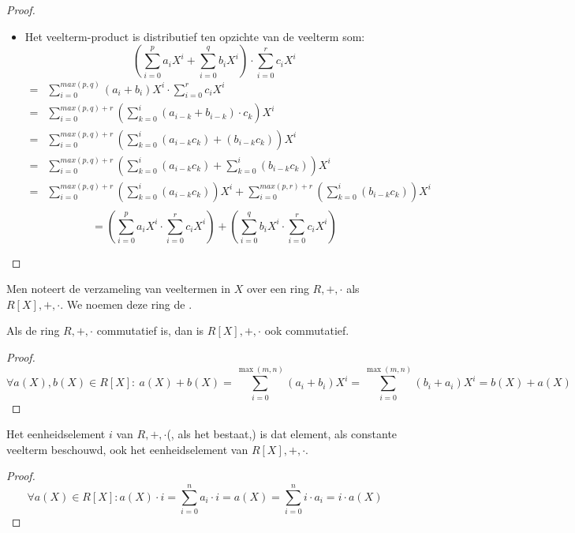 \documentclass[main.tex]{subfiles}
\begin{document}
\begin{ei}
\begin{proof}
\begin{itemize}
    \item Het veelterm-product is distributief ten opzichte van de veelterm som:
      \[ \left(\sum_{i=0}^{p}a_{i} X^{i} + \sum_{i=0}^{q}b_{i} X^{i}\right)  \cdot \sum_{i=0}^{r}c_{i} X^{i} \]
      \[
      \begin{array}{rc}
        =&
           \sum_{i=0}^{max(p,q)}(a_{i}+b_{i}) X^{i}  \cdot \sum_{i=0}^{r}c_{i} X^{i}\\
        =&
           \sum_{i=0}^{max(p,q)+r} \left(\sum_{k=0}^{i}(a_{i-k}+b_{i-k})\cdot c_{k}\right) X^{i}\\
        =&
           \sum_{i=0}^{max(p,q)+r} \left(\sum_{k=0}^{i}(a_{i-k}c_{k})+(b_{i-k}c_{k})\right) X^{i}\\
        =&
           \sum_{i=0}^{max(p,q)+r} \left(\sum_{k=0}^{i}(a_{i-k}c_{k}) + \sum_{k=0}^{i}\left(b_{i-k}c_{k}\right)\right) X^{i}\\
        =&
           \sum_{i=0}^{max(p,q)+r} \left(\sum_{k=0}^{i}(a_{i-k}c_{k})\right)X^{i} +  \sum_{i=0}^{max(p,r)+r} \left(\sum_{k=0}^{i}\left(b_{i-k}c_{k}\right)\right) X^{i}\\
      \end{array}
\]
      \[ = \left(\sum_{i=0}^{p}a_{i} X^{i} \cdot \sum_{i=0}^{r}c_{i} X^{i}\right)  + \left(\sum_{i=0}^{q}b_{i} X^{i} \cdot \sum_{i=0}^{r}c_{i} X^{i}\right) \]
    \end{itemize}
  \end{proof}
\end{ei}

\begin{de}
  Men noteert de verzameling van veeltermen in $X$ over een ring $R,+,\cdot$ als $R[X],+,\cdot$.
  We noemen deze ring de .
\end{de}

\begin{st}
  \label{st:veeltermen-comm-asa-ring-comm}
  Als de ring $R,+,\cdot$ commutatief is, dan is $R[X],+,\cdot$ ook commutatief.
  \begin{proof}
    \[ \forall a(X), b(X) \in R[X]:\ a(X) + b(X) = \sum_{i=0}^{\max(m,n)}(a_{i} + b_{i})X^{i} = \sum_{i=0}^{\max(m,n)}(b_{i} + a_{i})X^{i} = b(X) + a(X) \]
  \end{proof}
\end{st}

\begin{st}
  \label{st:veeltermen-eenh-asa-ring-eenh}
    Het eenheidselement $i$ van $R,+,\cdot$(, als het bestaat,) is dat element, als constante veelterm beschouwd, ook het eenheidselement van $R[X],+,\cdot$.
    \begin{proof}
      \[ \forall a(X) \in R[X]: a(X) \cdot i = \sum_{i=0}^{n}a_{i}\cdot i = a(X) = \sum_{i=0}^{n}i \cdot a_{i} = i \cdot a(X) \]
  \end{proof}
\end{st}
\end{document}
